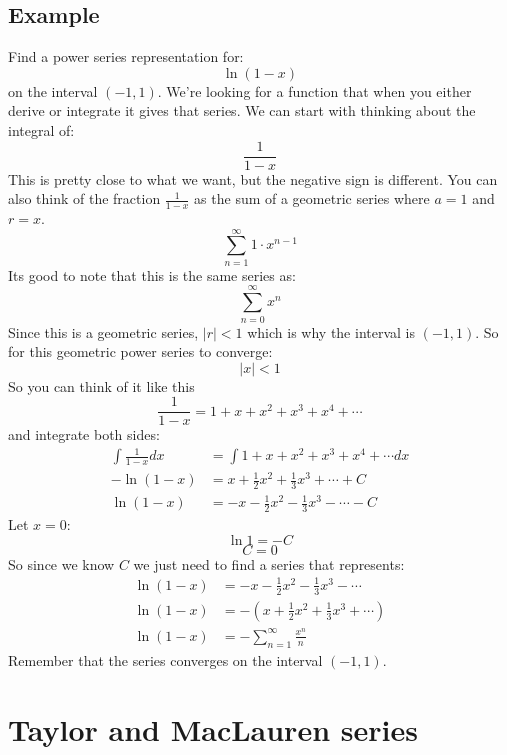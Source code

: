 \documentclass{article}
\begin{document}
    \subsection{Example}
        Find a power series representation for:
        \[\ln (1-x)\]
        on the interval \((-1, 1)\).
        We're looking for a function that when you either derive or integrate it gives that series.
        We can start with thinking about the integral of:
        \[\frac{1}{1-x}\]
        This is pretty close to what we want, but the negative sign is different.
        You can also think of the fraction \(\frac{1}{1-x}\) as the sum of a geometric series where \(a = 1\) and \(r = x\).
        \[\sum_{n = 1}^{\infty} 1 \cdot x^{n-1} \]
        Its good to note that this is the same series as:
        \[\sum_{n=0}^{\infty} x^n\]
        Since this is a geometric series, \(|r| < 1\) which is why the interval is \((-1, 1)\).
        So for this geometric power series to converge:
        \[|x| < 1\]
        So you can think of it like this
        \[\frac{1}{1-x} = 1 + x + x^2 + x^3 + x^4 + \cdots\]
        and integrate both sides:
        \begin{align*}
            \int \frac{1}{1-x} dx &= \int 1 + x + x^2 + x^3 + x^4 + \cdots dx \\
            - \ln (1-x) &= x + \frac{1}{2}x^2 + \frac{1}{3}x^3 + \cdots + C \\
            \ln (1-x) &= -x - \frac{1}{2}x^2 - \frac{1}{3}x^3 - \cdots - C 
        \end{align*}
        Let \(x = 0\):
        \[\ln 1 = -C\]
        \[C = 0\]
        So since we know \(C\) we just need to find a series that represents:
        \begin{align*}
            \ln (1-x) &= -x - \frac{1}{2}x^2 - \frac{1}{3}x^3 - \cdots \\
            \ln (1-x) &= -(x + \frac{1}{2}x^2 + \frac{1}{3}x^3 + \cdots) \\
            \ln (1-x) &= - \sum_{n = 1}^{\infty} \frac{x^n}{n}
        \end{align*}
        Remember that the series converges on the interval \((-1, 1)\).

\section{Taylor and MacLauren series}
    
\end{document}
